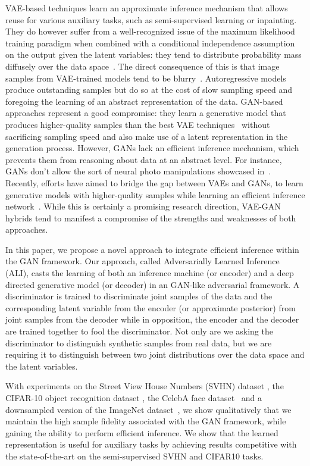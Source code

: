 \documentclass{article}
\begin{document}
VAE-based techniques learn an approximate inference mechanism that allows reuse
for various auxiliary tasks, such as semi-supervised learning or inpainting.
They do however suffer from a well-recognized issue of the maximum likelihood
training paradigm when combined with a conditional independence assumption on
the output given the latent variables: they tend to distribute probability mass
diffusely over the data space~\citep{Theis2015}. The direct consequence of this
is that image samples from VAE-trained models tend to be
blurry~\citep{goodfellow2014generative,larsen2015autoencoding}. Autoregressive
models produce outstanding samples but do so at the cost of slow sampling speed
and foregoing the learning of an abstract representation of the data. GAN-based
approaches represent a good compromise: they learn a generative model that
produces higher-quality samples than the best VAE
techniques~\citep{radford2015unsupervised,larsen2015autoencoding} without
sacrificing sampling speed and also make use of a latent representation in the
generation process. However, GANs lack an efficient inference mechanism, which
prevents them from reasoning about data at an abstract level. For instance, GANs
don't allow the sort of neural photo manipulations showcased
in~\citep{brock2016neural}. Recently, efforts have aimed to bridge the gap
between VAEs and GANs, to learn generative models with higher-quality samples
while learning an efficient inference
network~\citep{larsen2015autoencoding,lamb2016discriminative,
dosovitskiy2016generating}. While this is certainly a promising research
direction, VAE-GAN hybrids tend to manifest a compromise of the strengths and
weaknesses of both approaches.

In this paper, we propose a novel approach  to integrate efficient inference
within the GAN framework. Our approach, called Adversarially Learned Inference
(ALI), casts the learning of both an inference machine (or encoder) and a deep
directed generative model (or decoder) in an GAN-like adversarial framework. A
discriminator is trained to discriminate joint samples of the data and the
corresponding latent variable from the encoder (or approximate posterior) from
joint samples from the decoder while in opposition, the encoder and the decoder
are trained together to fool the discriminator. Not only are we asking the
discriminator to distinguish synthetic samples from real data, but we are
requiring it to distinguish between two joint distributions over the data space
and the latent variables.

With experiments on the Street View House Numbers (SVHN) dataset
\citep{netzer2011reading}, the CIFAR-10 object recognition dataset
\citep{krizhevsky2009learning}, the CelebA face dataset~\citep{liu2015deep} and
a downsampled version of the ImageNet dataset~\citep{russakovsky2015imagenet},
we show qualitatively that we maintain the high sample fidelity associated with
the GAN framework, while gaining the ability to perform efficient inference. We
show that the learned representation is useful for auxiliary tasks by achieving
results competitive with the state-of-the-art on the semi-supervised SVHN and
CIFAR10 tasks.
\end{document}

